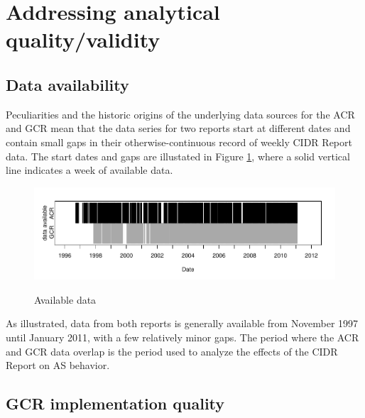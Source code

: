 \section{Addressing analytical quality/validity}

\subsection{Data availability}
Peculiarities and the historic origins of the underlying data sources for the
ACR and GCR mean that the data series for two reports start at different dates
and contain small gaps in their otherwise-continuous record of weekly CIDR
Report data. The start dates and gaps are illustated in Figure
\ref{fig:avail_data}, where a solid vertical line indicates a week of available
data.

\begin{figure}[h!]
\begin{centering}
\begin{singlespace}
    \includegraphics[width=6in]{figures/data_avail.pdf}
    \vspace{-2em}\\
    \caption{Available data}
    \label{fig:avail_data}
\end{singlespace}
\end{centering}
\end{figure}

As illustrated, data from both reports is generally available from November 1997
until January 2011, with a few relatively minor gaps. The period where the ACR
and GCR data overlap is the period used to analyze the effects of the CIDR
Report on AS behavior.


\subsection{GCR implementation quality}

